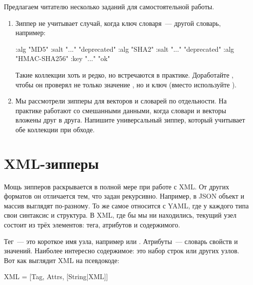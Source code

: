 Предлагаем читателю несколько заданий для самостоятельной работы.

\begin{enumerate}

\item
  Зиппер  не учитывает случай, когда ключ словаря~--- другой словарь,
  например:

\begin{english}
  \begin{clojure}
{{:alg "MD5" :salt "..."} "deprecated"
 {:alg "SHA2" :salt "..."} "deprecated"
 {:alg "HMAC-SHA256" :key "..."} "ok"}
  \end{clojure}
\end{english}

Такие коллекции хоть и редко, но встречаются в практике. Доработайте ,
чтобы он проверял не только значение , но и ключ (вместо 
используйте ).

\item
  Мы рассмотрели зипперы для векторов и словарей по отдельности. На практике
  работают со смешанными данными, когда словари и векторы вложены друг в
  друга. Напишите универсальный зиппер, который учитывает обе коллекции при
  обходе.

\end{enumerate}

\section{XML-зипперы}


Мощь зипперов раскрывается в полной мере при работе с XML. От других форматов он
отличается тем, что задан рекурсивно. Например, в JSON объект и массив выглядят
по-разному. То же самое относится с YAML, где у каждого типа свои синтаксис и
структура. В XML, где бы мы ни находились, текущий узел состоит из трёх
элементов: тега, атрибутов и содержимого.

Тег~--- это короткое имя узла, например  или . Атрибуты~---
словарь свойств и значений. Наиболее интересно содержимое: это набор строк
или других узлов. Вот как выглядит XML на псевдокоде:

\begin{english}
  \begin{text}
XML = [Tag, Attrs, [String|XML]]
  \end{text}
\end{english}

